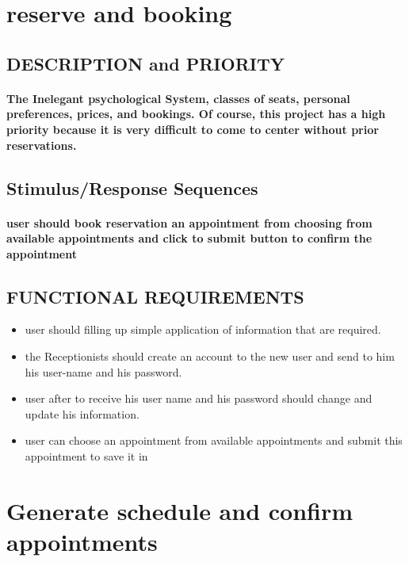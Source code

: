 \documentclass[../Psychological_system_web_application.tex]{subfiles}
\begin{document}
		
			\section{reserve and booking}
				\subsection{DESCRIPTION and PRIORITY}
					\paragraph{The Inelegant psychological System, classes of seats, personal preferences, prices, and bookings. Of course, this project has a high priority because it is very difficult to come to center without prior reservations.}
					
				\subsection{Stimulus/Response Sequences}
					\paragraph{user should book reservation an appointment from choosing from available appointments and click to submit button to confirm the appointment}
					
				\subsection{FUNCTIONAL REQUIREMENTS}
					\begin{itemize}
						\item
							user should filling up simple application of information that are required.
						\item
							the \gls{Receptionists} should create an account to the new user and send to him his user-name and his password.
						\item
							user after to receive his user name and his password should change and update his information.
						\item
							user can choose an appointment from available appointments and submit this appointment to save it in  
					\end{itemize}
					
					
			\section{Generate schedule and confirm appointments}
\end{document}

